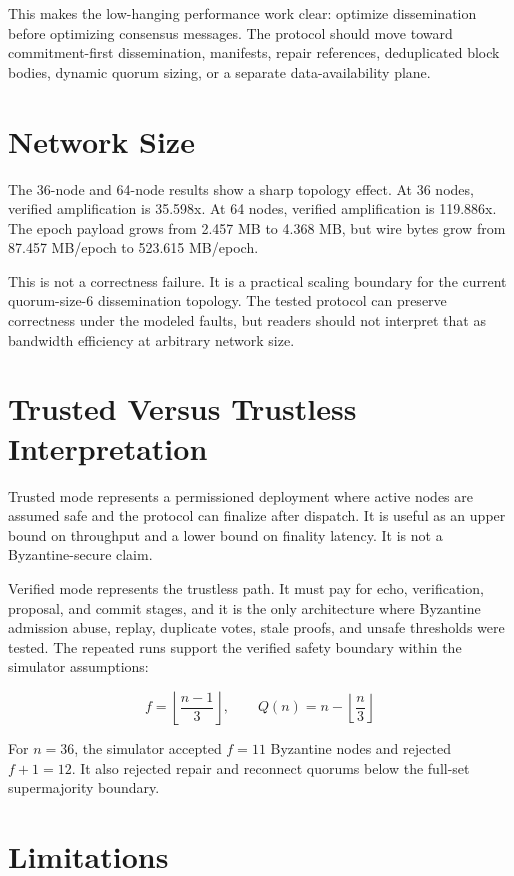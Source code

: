 \documentclass[11pt]{article}
\begin{document}
This makes the low-hanging performance work clear: optimize dissemination
before optimizing consensus messages. The protocol should move toward
commitment-first dissemination, manifests, repair references, deduplicated
block bodies, dynamic quorum sizing, or a separate data-availability plane.

\section{Network Size}

The 36-node and 64-node results show a sharp topology effect. At 36 nodes,
verified amplification is 35.598x. At 64 nodes, verified amplification is
119.886x. The epoch payload grows from 2.457 MB to 4.368 MB, but wire bytes
grow from 87.457 MB/epoch to 523.615 MB/epoch.

This is not a correctness failure. It is a practical scaling boundary for the
current quorum-size-6 dissemination topology. The tested protocol can preserve
correctness under the modeled faults, but readers should not interpret that as
bandwidth efficiency at arbitrary network size.

\section{Trusted Versus Trustless Interpretation}

Trusted mode represents a permissioned deployment where active nodes are
assumed safe and the protocol can finalize after dispatch. It is useful as an
upper bound on throughput and a lower bound on finality latency. It is not a
Byzantine-secure claim.

Verified mode represents the trustless path. It must pay for echo,
verification, proposal, and commit stages, and it is the only architecture where
Byzantine admission abuse, replay, duplicate votes, stale proofs, and unsafe
thresholds were tested. The repeated runs support the verified safety boundary
within the simulator assumptions:

\[
f = \left\lfloor \frac{n-1}{3} \right\rfloor,\qquad
Q(n)=n-\left\lfloor\frac{n}{3}\right\rfloor
\]

For \(n=36\), the simulator accepted \(f=11\) Byzantine nodes and rejected
\(f+1=12\). It also rejected repair and reconnect quorums below the full-set
supermajority boundary.

\section{Limitations}
\end{document}
